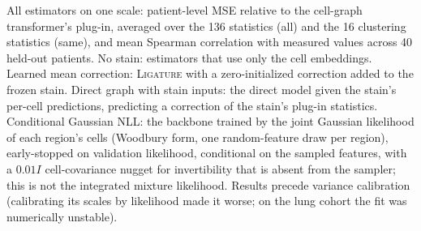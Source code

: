 \documentclass[10pt,letterpaper]{article}
\theoremstyle{definition}
\theoremstyle{remark}
\newcommand{\method}{\textnormal{\textsc{Ligature}}}
\begin{document}
\begin{table}[htp]
\centering
\caption{All estimators on one scale: patient-level MSE relative to the cell-graph transformer's plug-in, averaged over the 136 statistics (all) and the 16 clustering statistics (same), and mean Spearman correlation with measured values across 40 held-out patients. No stain: estimators that use only the cell embeddings. Learned mean correction: \method{} with a zero-initialized correction added to the frozen stain. Direct graph with stain inputs: the direct model given the stain's per-cell predictions, predicting a correction of the stain's plug-in statistics. Conditional Gaussian NLL: the backbone trained by the joint Gaussian likelihood of each region's cells (Woodbury form, one random-feature draw per region), early-stopped on validation likelihood, conditional on the sampled features, with a $0.01I$ cell-covariance nugget for invertibility that is absent from the sampler; this is not the integrated mixture likelihood. Results precede variance calibration (calibrating its scales by likelihood made it worse; on the lung cohort the fit was numerically unstable).}
\label{tab:common}
\normalsize

\end{table}
\end{document}
